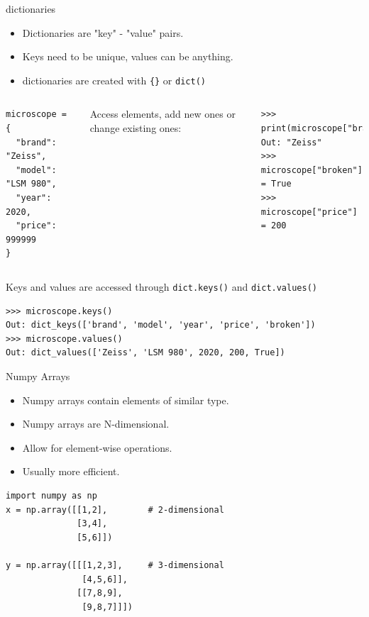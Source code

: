 \documentclass[compress%
,aspectratio=169%
]{beamer}
\newcommand{\code}{\lstinline}
\begin{document}
\begin{frame}[fragile]{dictionaries}
\vspace{-0.3cm}
\begin{itemize}
    \item Dictionaries are "key" - "value" pairs. 
    \item Keys need to be unique, values can be anything.
    \item dictionaries are created with \code|{}| or \code{dict()}
\end{itemize}
\vspace{0.1cm}

\begin{columns}
\begin{lstlisting}
microscope = {
  "brand": "Zeiss",
  "model": "LSM 980",
  "year": 2020,
  "price": 999999
}
\end{lstlisting}

\footnotesize Access elements, add new ones or change existing ones:
\begin{lstlisting}
>>>  print(microscope["brand"])
Out: "Zeiss"
>>> microscope["broken"] = True
>>> microscope["price"] = 200
\end{lstlisting}
\end{columns}
Keys and values are accessed through \code{dict.keys()} and \code{dict.values()}
\begin{lstlisting}
>>> microscope.keys()
Out: dict_keys(['brand', 'model', 'year', 'price', 'broken'])
>>> microscope.values()
Out: dict_values(['Zeiss', 'LSM 980', 2020, 200, True])
\end{lstlisting}

\end{frame}

\begin{frame}[fragile]{Numpy Arrays}
    
\begin{itemize}
    \item Numpy arrays contain elements of similar type.
    \item Numpy arrays are N-dimensional.
    \item Allow for element-wise operations.
    \item Usually more efficient.
\end{itemize}

\begin{lstlisting}
import numpy as np
x = np.array([[1,2],        # 2-dimensional
              [3,4],
              [5,6]])           

y = np.array([[[1,2,3],     # 3-dimensional
               [4,5,6]],          
              [[7,8,9],
               [9,8,7]]])
\end{lstlisting}
    
\end{frame}
\end{document}
